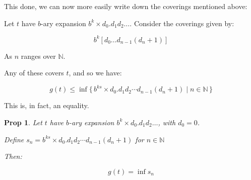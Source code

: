 \documentclass[11pt]{amsart}
\newcommand{\N}{\mathbb{N}}
\newtheorem{prop}{Prop}
\begin{document}
This done, we can now more easily write down the coverings mentioned above:

Let $t$ have $b$-ary expansion $b^k \times d_0 . d_1 d_2 \dots$. Consider the coverings given by:

\[ b^k [d_0 \dots d_{n-1} (d_n + 1)] \]

As $n$ ranges over $\N$.

Any of these covers $t$, and so we have:

\[ g(t) \leq \inf \{\, b^{ks} \times d_0 . d_1 d_2 \cdots d_{n-1} (d_n + 1) \mid n \in \N\,\}\]

This is, in fact, an equality.

\begin{prop}
Let $t$ have $b$-ary expansion $b^k \times d_0 . d_1 d_2 \dots$, with $d_0 = 0$.

Define $s_n = b^{ks} \times d_0 . d_1 d_2 \cdots d_{n-1} (d_n + 1)$ for $n \in \N$

Then:

\[ g(t) = \inf s_n\]
\end{prop}
\end{document}
